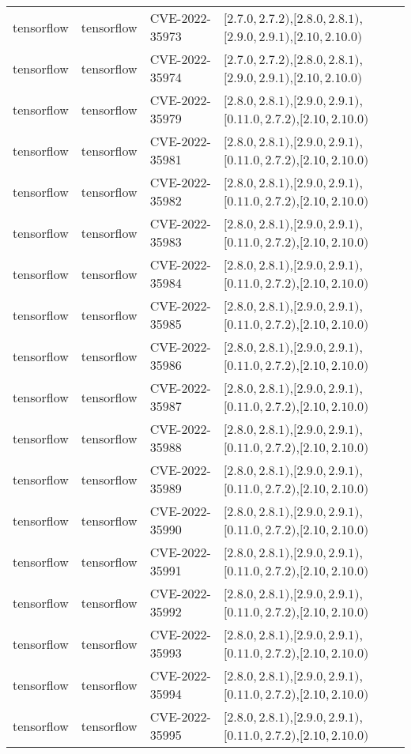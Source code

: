 \begin{tabular}{llll}
tensorflow & tensorflow & CVE-2022-35973 & $[2.7.0,2.7.2)$,$[2.8.0,2.8.1)$,$[2.9.0,2.9.1)$,$[2.10,2.10.0)$ \\
tensorflow & tensorflow & CVE-2022-35974 & $[2.7.0,2.7.2)$,$[2.8.0,2.8.1)$,$[2.9.0,2.9.1)$,$[2.10,2.10.0)$ \\
tensorflow & tensorflow & CVE-2022-35979 & $[2.8.0,2.8.1)$,$[2.9.0,2.9.1)$,$[0.11.0,2.7.2)$,$[2.10,2.10.0)$ \\
tensorflow & tensorflow & CVE-2022-35981 & $[2.8.0,2.8.1)$,$[2.9.0,2.9.1)$,$[0.11.0,2.7.2)$,$[2.10,2.10.0)$ \\
tensorflow & tensorflow & CVE-2022-35982 & $[2.8.0,2.8.1)$,$[2.9.0,2.9.1)$,$[0.11.0,2.7.2)$,$[2.10,2.10.0)$ \\
tensorflow & tensorflow & CVE-2022-35983 & $[2.8.0,2.8.1)$,$[2.9.0,2.9.1)$,$[0.11.0,2.7.2)$,$[2.10,2.10.0)$ \\
tensorflow & tensorflow & CVE-2022-35984 & $[2.8.0,2.8.1)$,$[2.9.0,2.9.1)$,$[0.11.0,2.7.2)$,$[2.10,2.10.0)$ \\
tensorflow & tensorflow & CVE-2022-35985 & $[2.8.0,2.8.1)$,$[2.9.0,2.9.1)$,$[0.11.0,2.7.2)$,$[2.10,2.10.0)$ \\
tensorflow & tensorflow & CVE-2022-35986 & $[2.8.0,2.8.1)$,$[2.9.0,2.9.1)$,$[0.11.0,2.7.2)$,$[2.10,2.10.0)$ \\
tensorflow & tensorflow & CVE-2022-35987 & $[2.8.0,2.8.1)$,$[2.9.0,2.9.1)$,$[0.11.0,2.7.2)$,$[2.10,2.10.0)$ \\
tensorflow & tensorflow & CVE-2022-35988 & $[2.8.0,2.8.1)$,$[2.9.0,2.9.1)$,$[0.11.0,2.7.2)$,$[2.10,2.10.0)$ \\
tensorflow & tensorflow & CVE-2022-35989 & $[2.8.0,2.8.1)$,$[2.9.0,2.9.1)$,$[0.11.0,2.7.2)$,$[2.10,2.10.0)$ \\
tensorflow & tensorflow & CVE-2022-35990 & $[2.8.0,2.8.1)$,$[2.9.0,2.9.1)$,$[0.11.0,2.7.2)$,$[2.10,2.10.0)$ \\
tensorflow & tensorflow & CVE-2022-35991 & $[2.8.0,2.8.1)$,$[2.9.0,2.9.1)$,$[0.11.0,2.7.2)$,$[2.10,2.10.0)$ \\
tensorflow & tensorflow & CVE-2022-35992 & $[2.8.0,2.8.1)$,$[2.9.0,2.9.1)$,$[0.11.0,2.7.2)$,$[2.10,2.10.0)$ \\
tensorflow & tensorflow & CVE-2022-35993 & $[2.8.0,2.8.1)$,$[2.9.0,2.9.1)$,$[0.11.0,2.7.2)$,$[2.10,2.10.0)$ \\
tensorflow & tensorflow & CVE-2022-35994 & $[2.8.0,2.8.1)$,$[2.9.0,2.9.1)$,$[0.11.0,2.7.2)$,$[2.10,2.10.0)$ \\
tensorflow & tensorflow & CVE-2022-35995 & $[2.8.0,2.8.1)$,$[2.9.0,2.9.1)$,$[0.11.0,2.7.2)$,$[2.10,2.10.0)$ \\

\end{tabular}

